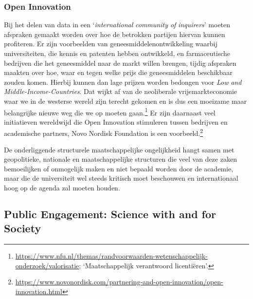 \documentclass[smallauthor, chapterhaspagenum, nochapterinheader, pagenuminheader,  bigchapnum,medium2, tocpages, garamond, titleinheader]{jote-book}
\begin{document}
	\subsubsection{Open Innovation}



	Bij het delen van data in een ‘\emph{international}\emph{ community of }\emph{inquirers}' moeten afspraken gemaakt worden over hoe de betrokken partijen hiervan kunnen profiteren. Er zijn voorbeelden van geneesmiddelenontwikkeling waarbij universiteiten, die kennis en patenten hebben ontwikkeld, en farmaceutische bedrijven die het geneesmiddel naar de markt willen brengen, tijdig afspraken maakten over hoe, waar en tegen welke prijs die geneesmiddelen beschikbaar zouden komen. Hierbij kunnen dan lage prijzen worden bedongen voor \emph{Low }\emph{and}\emph{ }\emph{Middle-Income-Countries}. Dat wijkt af van de neoliberale vrijemarkteconomie waar we in de westerse wereld zijn terecht gekomen en is dus een moeizame maar belangrijke nieuwe weg die we op moeten gaan.\footnote{\href{https://www.nfu.nl/themas/randvoorwaarden-wetenschappelijk-onderzoek/valorisatie}{https://www.nfu.nl/themas/randvoorwaarden-wetenschappelijk-onderzoek/valorisatie}; ‘Maatschappelijk verantwoord licentiëren'.} Er zijn daarnaast veel initiatieven wereldwijd die Open Innovation stimuleren tussen bedrijven en academische partners, Novo Nordisk Foundation is een voorbeeld.\footnote{\href{https://www.novonordisk.com/partnering-and-open-innovation/open-innovation.html}{https://www.novonordisk.com/partnering-and-open-innovation/open-innovation.html} }



	De onderliggende structurele maatschappelijke ongelijkheid hangt samen met geopolitieke, nationale en maatschappelijke structuren die veel van deze zaken bemoeilijken of onmogelijk maken en niet bepaald worden door de academie, maar die de universiteit wel steeds kritisch moet beschouwen en internationaal hoog op de agenda zal moeten houden.



	\subsection{Public Engagement: Science with and for Society }
\end{document}
